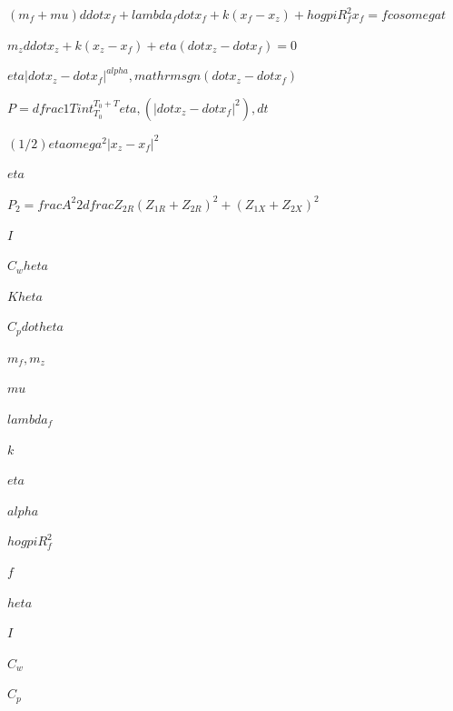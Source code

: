 
$(m_f+mu)ddot x_f + lambda_f dot x_f + k(x_f-x_z)+
ho gpi R_f^2 x_f = fcosomega t$

$m_zddot x_z + k(x_z-x_f)+eta(dot x_z-dot x_f)=0$

$eta|dot x_z-dot x_f|^{alpha},mathrm{sgn}(dot x_z-dot x_f)$

$P=dfrac{1}{T}int_{T_0}^{T_0+T}eta,(|dot x_z-dot x_f|^2),dt$

$(1/2)etaomega^2|x_z-x_f|^2$

$eta$

$P_2=	frac{A^2}{2}dfrac{Z_{2R}}{(Z_{1R}+Z_{2R})^2+(Z_{1X}+Z_{2X})^2}$

$I$

$C_w	heta$

$K	heta$

$C_pdot	heta$

$m_f,m_z$

$mu$

$lambda_f$

$k$

$eta$

$alpha$

$ho gpi R_f^2$

$f$

$heta$

$I$

$C_w$

$C_p$
